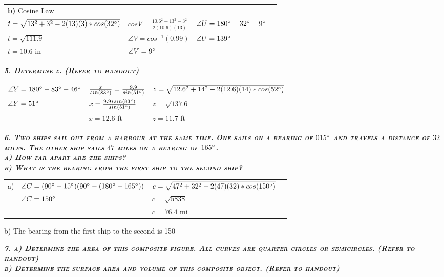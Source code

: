 \documentclass{article}
\begin{document}
\begin{tabular}{l l l l}
    \textbf{b)} Cosine Law & &
    & \\
    $t=\sqrt{13^2+3^2-2(13)(3)*cos(32\degree)}$ & $cosV=\frac{10.6^2+13^2-3^2}{2(10.6)(13)}$ & $\angle{U}=180\degree-32\degree-9\degree$
    & \\
    $t=\sqrt{111.9}$ & $\angle{V}=cos^{-1}(0.99)$ & $\angle{U}=139\degree$
    & \\
    $t=10.6$ in & $\angle{V}=9\degree$ & 
    & \\
\end{tabular}

\textbf{\emph{\textsc{5. Determine $z$. (Refer to handout)}}}

\begin{tabular}{l l l l}
    $\angle{Y}=180\degree-83\degree-46\degree$ & $\frac{x}{sin(83\degree)}=\frac{9.9}{sin(51\degree)}$ & $z=\sqrt{12.6^2+14^2-2(12.6)(14)*cos(52\degree)}$
    & \\
    $\angle{Y}=51\degree$ & $x=\frac{9.9*sin(83\degree)}{sin(51\degree)}$ & $z=\sqrt{137.6}$
    & \\
    & $x=12.6$ ft & $z=11.7$ ft
    & \\
\end{tabular}

\textbf{\emph{\textsc{6. Two ships sail out from a harbour at the same time. One sails on a bearing of $015\degree$ and travels a distance of $32$ miles. The other ship sails $47$ miles on a bearing of $165\degree$. \\
a) How far apart are the ships? \\
b) What is the bearing from the first ship to the second ship?}}}

\begin{tabular}{l l l l}
    a) & $\angle{C}=(90\degree-15\degree)(90\degree-(180\degree-165\degree))$ & $c=\sqrt{47^2+32^2-2(47)(32)*cos(150\degree)}$
    & \\
    & $\angle{C}=150\degree$ & $c=\sqrt{5838}$
    & \\
    & & $c=76.4$ mi
    & \\
\end{tabular}
b) The bearing from the first ship to the second is 150\degree

\textbf{\emph{\textsc{7. a) Determine the area of this composite figure. All curves are quarter circles or semicircles. (Refer to handout) \\
b) Determine the surface area and volume of this composite object. (Refer to handout)}}}
\begin{tabular}{l l}
\end{tabular}
\end{document}
